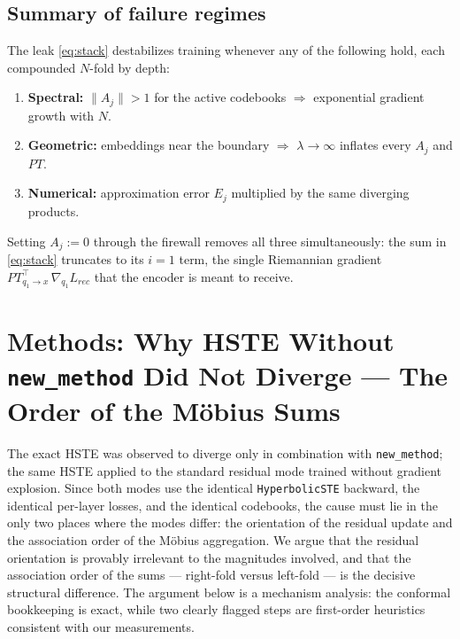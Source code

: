 \documentclass{article}
\begin{document}
\subsection*{Summary of failure regimes}
The leak \eqref{eq:stack} destabilizes training whenever any of the following hold, each compounded $N$-fold by depth:
\begin{enumerate}
    \item \textbf{Spectral:} $\|A_j\| > 1$ for the active codebooks $\Rightarrow$ exponential gradient growth with $N$.
    \item \textbf{Geometric:} embeddings near the boundary $\Rightarrow$ $\lambda \to \infty$ inflates every $A_j$ and $PT$.
    \item \textbf{Numerical:} approximation error $E_j$ multiplied by the same diverging products.
\end{enumerate}
Setting $A_j := 0$ through the firewall removes all three simultaneously: the sum in \eqref{eq:stack} truncates to its $i=1$ term, the single Riemannian gradient $PT_{q_1\to x}^{\top}\,\nabla_{q_1} L_{rec}$ that the encoder is meant to receive.

\section*{Methods: Why HSTE Without \texttt{new\_method} Did Not Diverge --- The Order of the M\"obius Sums}

The exact HSTE was observed to diverge only in combination with \texttt{new\_method}; the same HSTE applied to the standard residual mode trained without gradient explosion. Since both modes use the identical \texttt{HyperbolicSTE} backward, the identical per-layer losses, and the identical codebooks, the cause must lie in the only two places where the modes differ: the orientation of the residual update and the association order of the M\"obius aggregation. We argue that the residual orientation is provably irrelevant to the magnitudes involved, and that the association order of the sums --- right-fold versus left-fold --- is the decisive structural difference. The argument below is a mechanism analysis: the conformal bookkeeping is exact, while two clearly flagged steps are first-order heuristics consistent with our measurements.
\end{document}
